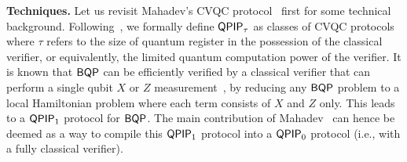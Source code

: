 %

\vspace{2mm} \noindent \textbf{Techniques.} Let us revisit Mahadev's CVQC protocol~\cite{FOCS:Mahadev18a} first for some technical background. 
Following~\cite{FOCS:Mahadev18a}, we formally define $\operatorname{\mathsf{QPIP}}_{\tau}$ as classes of CVQC protocols where $\tau$ refers to the size of quantum register in the possession of the classical verifier, or equivalently, the limited quantum computation power of the verifier.
It is known that $\operatorname{\mathsf{BQP}}$ can be efficiently verified by a classical verifier that can perform a single qubit $X$ or $Z$ measurement~\cite{PhysRevA.93.022326, mf16}, by reducing any $\operatorname{\mathsf{BQP}}$ problem to a local Hamiltonian problem where each term consists of  $X$ and $Z$ only. This leads to a $\operatorname{\mathsf{QPIP}}_1$ protocol for $\operatorname{\mathsf{BQP}}$.
The main contribution of Mahadev~\cite{FOCS:Mahadev18a} can hence be deemed as a way to compile this $\operatorname{\mathsf{QPIP}}_1$ protocol into a $\operatorname{\mathsf{QPIP}}_0$ protocol (i.e., with a fully classical verifier).

